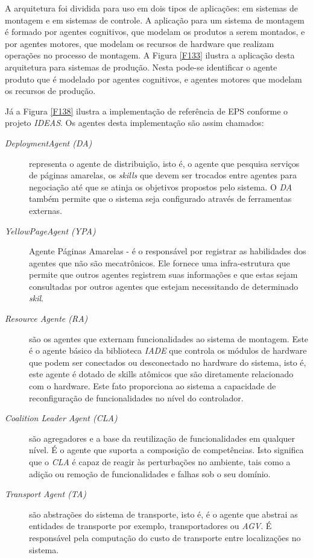  A arquitetura foi dividida para uso em dois tipos de aplicações: em sistemas de montagem e em sistemas de controle. A aplicação para um sistema de montagem é formado por agentes cognitivos, que modelam os produtos a serem montados, e por agentes motores, que modelam os recursos de hardware que realizam operações no processo de montagem. A Figura \ref{F133} ilustra a aplicação desta arquitetura para sistemas de produção. Nesta pode-se identificar o agente produto que é modelado por agentes cognitivos, e agentes motores que modelam os recursos de produção. 
 	 	  
 	 	  
 Já a Figura \ref{F138} ilustra a implementação de referência de EPS conforme o projeto \textit{IDEAS}. Os agentes desta implementação são assim chamados:
 	 	  
 	 	  \begin{description}	
 	 	  	
 	 	  	\item[\textit{DeploymentAgent (DA)}]  representa o agente de distribuição, isto é, o agente que  pesquisa serviços de páginas amarelas, os \textit{skills} que devem ser trocados entre agentes para negociação até que se atinja os objetivos propostos pelo sistema. O \textit{DA} também permite que o sistema seja configurado através de ferramentas externas.
 	 	  	
 	 	  	\item[\textit{YellowPageAgent (YPA)}] Agente Páginas Amarelas - é o responsável por registrar as habilidades dos agentes que não são mecatrônicos. Ele fornece uma infra-estrutura que permite que outros agentes registrem suas informações e que estas sejam consultadas por outros agentes que estejam necessitando de determinado \textit{skil}.
 	 	  	
 	 	  	\item[\textit{Resource Agente (RA)}] são os agentes que externam funcionalidades ao sistema de montagem. Este é o agente básico da biblioteca \textit{IADE} que controla os módulos de hardware que podem ser conectados ou desconectado no hardware do sistema, isto é, este agente é dotado de skills atômicos que são diretamente relacionado com o hardware. Este fato proporciona  ao sistema a capacidade de reconfiguração de funcionalidades no nível do controlador. 
 	 	  	
 	 	  	\item[\textit{Coalition Leader Agent (CLA)}]  são agregadores e a base da reutilização de funcionalidades em qualquer nível. É o agente que suporta a composição de competências. Isto significa que o \textit{CLA} é capaz de reagir às perturbações no ambiente, tais como a adição ou remoção de funcionalidades e falhas sob o seu domínio. 
 	 	  	
 	 	  	\item[\textit{Transport Agent (TA)}] são abstrações do sistema de transporte, isto é, é o agente que abstrai as entidades de transporte por exemplo, transportadores ou \textit{AGV}. É responsável pela computação do custo de transporte entre localizações no sistema.
 	 	  	
 	 	  \end{description}	
 	 	  
